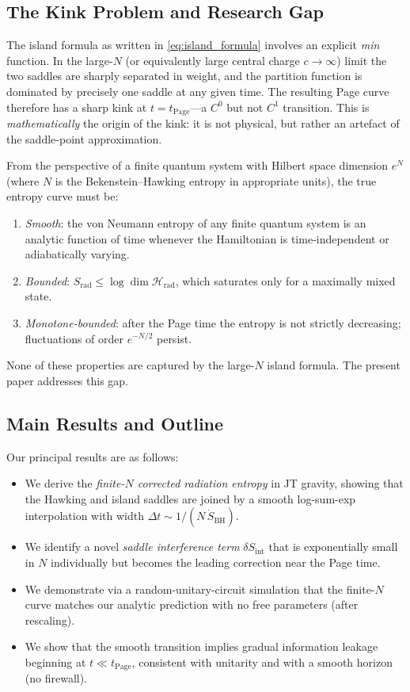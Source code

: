 \documentclass[12pt,a4paper]{article}
\newcommand{\Srad}{S_{\mathrm{rad}}}
\newcommand{\dS}{\delta S}
\newcommand{\tPage}{t_{\mathrm{Page}}}
\begin{document}
\subsection{The Kink Problem and Research Gap}
\label{subsec:kink_gap}

The island formula as written in \cref{eq:island_formula} involves an
explicit \emph{min} function.  In the large-$N$ (or equivalently large
central charge $c \to\infty$) limit the two saddles are sharply separated
in weight, and the partition function is dominated by precisely one saddle at
any given time.  The resulting Page curve therefore has a sharp kink at
$t = \tPage$—a $C^0$ but not $C^1$ transition.  This is
\emph{mathematically} the origin of the kink: it is not physical, but rather
an artefact of the saddle-point approximation.

From the perspective of a finite quantum system with Hilbert space dimension
$e^N$ (where $N$ is the Bekenstein--Hawking entropy in appropriate units),
the true entropy curve must be:
\begin{enumerate}[label=(\roman*)]
  \item \emph{Smooth}: the von Neumann entropy of any finite quantum system
    is an analytic function of time whenever the Hamiltonian is time-independent
    or adiabatically varying.
  \item \emph{Bounded}: $\Srad \le \log\dim\mathcal{H}_{\mathrm{rad}}$,
    which saturates only for a maximally mixed state.
  \item \emph{Monotone-bounded}: after the Page time the entropy is not
    strictly decreasing; fluctuations of order $e^{-N/2}$ persist.
\end{enumerate}

None of these properties are captured by the large-$N$ island formula.
The present paper addresses this gap.

\subsection{Main Results and Outline}
\label{subsec:results_outline}

Our principal results are as follows:

\begin{itemize}
  \item We derive the \emph{finite-$N$ corrected radiation entropy} in JT
    gravity, showing that the Hawking and island saddles are joined by a
    smooth log-sum-exp interpolation with width $\Delta t \sim 1/(N\,\dot{S}_{\mathrm{BH}})$.
  \item We identify a novel \emph{saddle interference term} $\dS_{\mathrm{int}}$
    that is exponentially small in $N$ individually but becomes the leading
    correction near the Page time.
  \item We demonstrate via a random-unitary-circuit simulation that the
    finite-$N$ curve matches our analytic prediction with no free parameters
    (after rescaling).
  \item We show that the smooth transition implies gradual information leakage
    beginning at $t \ll \tPage$, consistent with unitarity and with a smooth
    horizon (no firewall).
\end{itemize}
\end{document}
